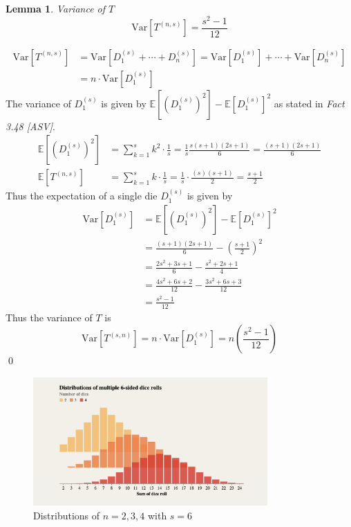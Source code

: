 \documentclass[a4paper]{article}
\newtheorem{lemma}{Lemma}
\renewenvironment{proof}{{\bfseries Proof}}{\qed}
\begin{document}
\begin{lemma}{Variance of $T$}
    $$ \text{Var}[T^{(n, s)}] = \frac{s^2 - 1}{12}  $$
\end{lemma}
%
\begin{proof}
    \begin{align*}
        \text{Var}[T^{(n, s)}] &= \text{Var}[D_{1}^{(s)} + \cdots + D_{n}^{(s)}] = \text{Var}[D_{1}^{(s)}] + \cdots + \text{Var}[D_{n}^{(s)}] \\
        &= n \cdot \text{Var}[D_{1}^{(s)}] 
    \end{align*}
    The variance of $D_{1}^{(s)}$ is given by $\mathbb{E}\left[(D_{1}^{(s)})^2 \right] - \mathbb{E}\left[D_{1}^{(s)} \right]^2$ as stated in \textit{Fact 3.48 [ASV]}.
    \begin{align*}
        \mathbb{E}\left[\left(D_{1}^{(s)}\right)^2 \right] &= \sum_{k=1}^{s} k^2 \cdot \frac{1}{s} = \frac{1}{s} \frac{s(s+1)(2s+1)}{6} = \frac{(s+1)(2s+1)}{6} \\
        \mathbb{E}[T^{(n, s)}] &= \sum_{k=1}^{s} k \cdot \frac{1}{s} = \frac{1}{s} \cdot \frac{(s)(s+1)}{2} = \frac{s+1}{2}
    \end{align*}
    Thus the expectation of a single die $D_{1}^{(s)}$ is given by 
    \begin{align*}
    \text{Var}[D_{1}^{(s)}] &= \mathbb{E}\left[(D_{1}^{(s)})^2 \right] - \mathbb{E}\left[D_{1}^{(s)} \right]^2 \\
    &= \frac{(s+1)(2s+1)}{6} - \left(\frac{s+1}{2} \right)^2 \\
    &= \frac{2s^2 + 3s + 1}{6} - \frac{s^2 + 2s + 1}{4} \\
    &= \frac{4s^2 + 6s + 2}{12} - \frac{3s^2 + 6s + 3}{12} \\
    &= \frac{s^2 - 1}{12}
    \end{align*}
    Thus the variance of $T$ is
    $$
    \text{Var}[T^{(s, n)}] = n \cdot \text{Var}[D_{1}^{(s)}]  = n \left(\frac{s^2 - 1}{12} \right)
    $$
\end{proof}


\begin{figure}[h]
\centering
\includegraphics[width=0.8\textwidth]{Screenshot 2023-12-10 at 19.58.36.png}
\caption{Distributions of $n = 2, 3, 4$ with $s = 6$}
\end{figure}
\end{document}
